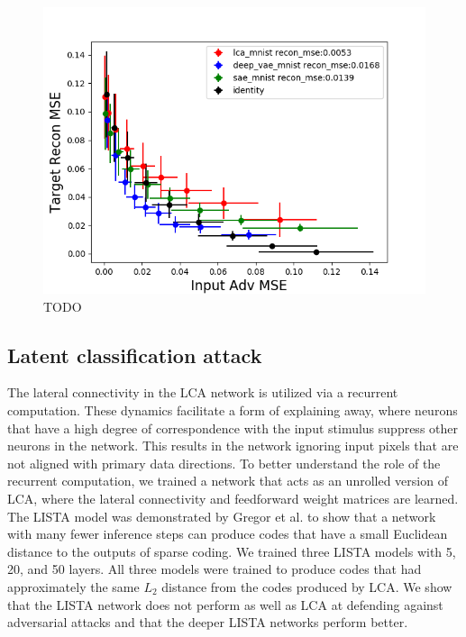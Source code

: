 %
%

\begin{figure}[h]\label{fig:kos_attack}
\begin{center}
\centerline{\includegraphics[width=\columnwidth]{Figures/recon_mult_tradeoff.png}}
\end{center}
\caption{TODO}
\end{figure}

\subsection{Latent classification attack}
The lateral connectivity in the LCA network is utilized via a recurrent computation. These dynamics facilitate a form of explaining away, where neurons that have a high degree of correspondence with the input stimulus suppress other neurons in the network. This results in the network ignoring input pixels that are not aligned with primary data directions. To better understand the role of the recurrent computation, we trained a network that acts as an unrolled version of LCA, where the lateral connectivity and feedforward weight matrices are learned. The LISTA model was demonstrated by Gregor et al. \citeyearpar{gregor2010learning} to show that a network with many fewer inference steps can produce codes that have a small Euclidean distance to the outputs of sparse coding. We trained three LISTA models with 5, 20, and 50 layers. All three models were trained to produce codes that had approximately the same $L_{2}$ distance from the codes produced by LCA. We show that the LISTA network does not perform as well as LCA at defending against adversarial attacks and that the deeper LISTA networks perform better.

